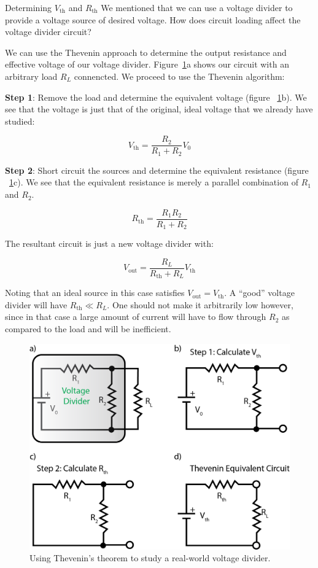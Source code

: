\documentclass{tufte-book}
\begin{document}
\begin{myexample}[label = ex:thev_theo]{Determining $V_\text{th}$ and $R_\text{th}$}
We mentioned that we can use a voltage divider to provide a voltage source of desired voltage. How does circuit loading affect the voltage divider circuit?

\noindent We can use the Thevenin approach to determine the output resistance and effective voltage of our voltage divider. Figure~\ref{fig:thvn_ex_2}a shows our circuit with an arbitrary load $R_L$ connencted. We proceed to use the Thevenin algorithm:

\noindent \textbf{Step 1}: Remove the load and determine the equivalent voltage (figure ~\ref{fig:thvn_ex_2}b). We see that the voltage is just that of the original, ideal voltage that we already have studied:

$$
V_\text{th} = \frac{R_2}{R_1+R_2}V_0
$$

\noindent \textbf{Step 2}: Short circuit the sources and determine the equivalent resistance (figure ~\ref{fig:thvn_ex_2}c). We see that the equivalent resistance is merely a parallel combination of $R_1$ and $R_2$.

$$
R_\text{th} = \frac{R_1R_2}{R_1+R_2}
$$

\noindent The resultant circuit is just a new voltage divider with:

$$
V_\text{out} = \frac{R_L}{R_\text{th}+R_L}V_\text{th}
$$

Noting that an ideal source in this case satisfies $V_\text{out} = V_\text{th}$. A ``good'' voltage divider will have $R_\text{th} \ll R_L$. One should not make it arbitrarily low however, since in that case a large amount of current will have to flow through $R_2$ as compared to the load and will be inefficient.
\end{myexample}

\begin{figure}[h]
\caption{Using Thevenin's theorem to study a real-world voltage divider.}
\label{fig:thvn_ex_2}
\begin{center}
\includegraphics[width=\textwidth]{thvn_ex_2.png}
\end{center}
\end{figure}
\end{document}
